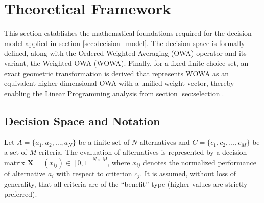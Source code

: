 \section{Theoretical Framework}
\label{sec:theory}

This section establishes the mathematical foundations required for the decision model applied in section \ref{sec:decision_model}. The decision space is formally defined, along with the Ordered Weighted Averaging (OWA) operator and its variant, the Weighted OWA (WOWA). Finally, for a fixed finite choice set, an exact geometric transformation is derived that represents WOWA as an equivalent higher-dimensional OWA with a unified weight vector, thereby enabling the Linear Programming analysis from section \ref{sec:selection}.

\subsection{Decision Space and Notation}

Let $A = \{a_1, a_2, \dots, a_N\}$ be a finite set of $N$ alternatives and $C = \{c_1, c_2, \dots, c_M\}$ be a set of $M$ criteria. The evaluation of alternatives is represented by a decision matrix $\mathbf{X}=(x_{ij})\in [0,1]^{N \times M}$, where $x_{ij}$ denotes the normalized performance of alternative $a_i$ with respect to criterion $c_j$. It is assumed, without loss of generality, that all criteria are of the ``benefit'' type (higher values are strictly preferred).


